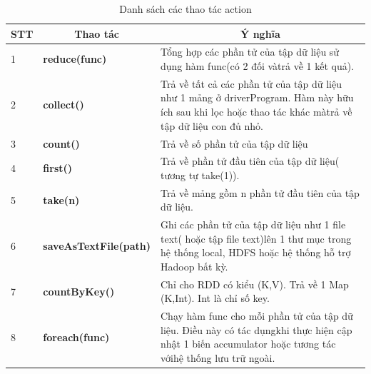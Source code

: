 \begin{table}[H]
	\centering
	\caption{Danh sách các thao tác action}
	\label{action}
	\begin{tabular}{p{1cm}p{5cm}p{10cm}}
		\toprule
		\textbf{STT} & \multicolumn{1}{c}{Thao tác}  & \multicolumn{1}{c}{\textbf{Ý nghĩa}}                                                                                                                   \\ \midrule
		1            & \textbf{reduce(func)}         & Tổng hợp các phần tử của tập dữ liệu sử dụng hàm func(có 2 đối vàtrả về 1 kết quả).                                                                    \\ \midrule
		2            & \textbf{collect()}            & Trả về tất cả các phần tử của tập dữ liệu như 1 mảng ở driverProgram. Hàm này hữu ích sau khi lọc hoặc thao tác khác màtrả về tập dữ liệu con đủ nhỏ.  \\ \midrule
		3            & \textbf{count()}              & Trả về số phần tử của tập dữ liệu                                                                                                                      \\ \midrule
		4            & \textbf{first()}              & Trả về phần tử đầu tiên của tập dữ liệu( tương tự take(1)).                                                                                            \\ \midrule
		5            & \textbf{take(n)}              & Trả về mảng gồm n phần tử đầu tiên của tập dữ liệu.                                                                                                    \\ \midrule
		6            & \textbf{saveAsTextFile(path)} & Ghi các phần tử của tập dữ liệu như 1 file text( hoặc tập file text)lên 1 thư mục trong hệ thống local, HDFS hoặc hệ thống hỗ trợ Hadoop bất kỳ.       \\ \midrule
		7            & \textbf{countByKey()}         & Chỉ cho RDD có kiểu (K,V). Trả về 1 Map (K,Int). Int là chỉ số key.                                                                                    \\ \midrule
		8            & \textbf{foreach(func)}        & Chạy hàm func cho mỗi phần tử của tập dữ liệu. Điều này có tác dụngkhi thực hiện cập nhật 1 biến accumulator hoặc tương tác vớihệ thống lưu trữ ngoài. \\ \bottomrule
	\end{tabular}
\end{table}

